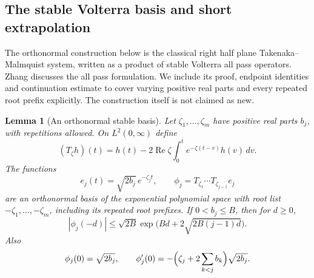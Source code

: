 \documentclass[11pt,a4paper]{article}
\numberwithin{equation}{section}
\newtheorem{lemma}[theorem]{Lemma}
\theoremstyle{definition}\newtheorem{definition}[theorem]{Definition}
\theoremstyle{remark}\newtheorem{remark}[theorem]{Remark}
\DeclareMathOperator{\Rea}{Re}\DeclareMathOperator{\Ima}{Im}
\begin{document}
\subsection{The stable Volterra basis and short extrapolation}
The orthonormal construction below is the classical right half plane
Takenaka--Malmquist system, written as a product of stable Volterra
all pass operators. Zhang \cite[Appendix A, especially Remark A.7]{Zhang}
discusses the all pass formulation. We include its proof, endpoint
identities and continuation estimate to cover varying positive real
parts and every repeated root prefix explicitly. The construction
itself is not claimed as new.

\begin{lemma}[An orthonormal stable basis]\label{gzb:lem:basis}
Let $\zeta_1,\ldots,\zeta_m$ have positive real parts $b_j$, with
repetitions allowed. On $L^2(0,\infty)$ define
\begin{equation}\label{gzb:eq:volterra}
 (T_\zeta h)(t)=h(t)-2\Rea\zeta
                    \int_0^t e^{-\zeta(t-v)}h(v)\,dv.
\end{equation}
The functions
\begin{equation}\label{gzb:eq:basis}
 e_j(t)=\sqrt{2b_j}\,e^{-\zeta_jt},\qquad
 \phi_j=T_{\zeta_1}\cdots T_{\zeta_{j-1}}e_j
\end{equation}
are an orthonormal basis of the exponential polynomial space with root
list $-\zeta_1,\ldots,-\zeta_m$, including its repeated root prefixes.
If $0<b_j\le B$, then for $d\ge0$,
\begin{equation}\label{gzb:eq:basis-growth}
 |\phi_j(-d)|\le\sqrt{2B}
   \exp\bigl(Bd+2\sqrt{2B(j-1)d}\bigr).
\end{equation}
Also
\begin{equation}\label{gzb:eq:basis-endpoints}
 \phi_j(0)=\sqrt{2b_j},\qquad
 \phi_j'(0)=-\Bigl(\zeta_j+2\sum_{k<j}b_k\Bigr)\sqrt{2b_j}.
\end{equation}
\end{lemma}
\end{document}
